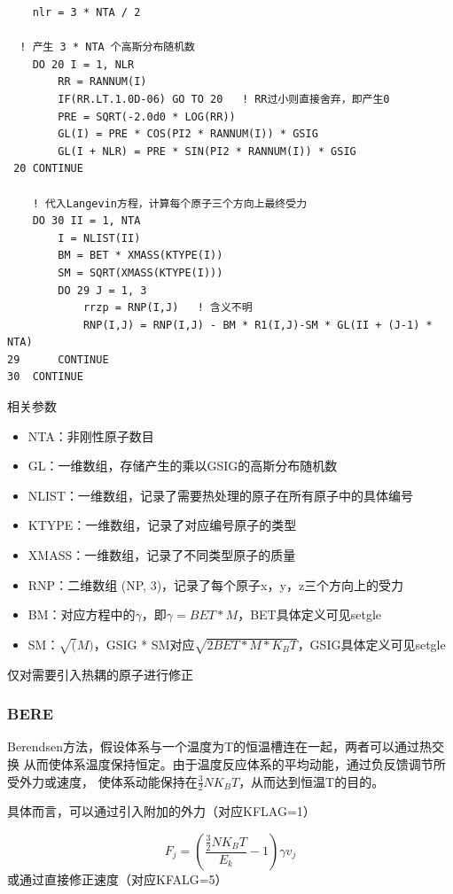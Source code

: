 \documentclass{ctexart}
\begin{document}
\begin{verbatim}
    nlr = 3 * NTA / 2
      
  ! 产生 3 * NTA 个高斯分布随机数
    DO 20 I = 1, NLR
        RR = RANNUM(I)
        IF(RR.LT.1.0D-06) GO TO 20   ! RR过小则直接舍弃，即产生0
        PRE = SQRT(-2.0d0 * LOG(RR))
        GL(I) = PRE * COS(PI2 * RANNUM(I)) * GSIG
        GL(I + NLR) = PRE * SIN(PI2 * RANNUM(I)) * GSIG
 20 CONTINUE

    ! 代入Langevin方程，计算每个原子三个方向上最终受力
    DO 30 II = 1, NTA
        I = NLIST(II)
        BM = BET * XMASS(KTYPE(I))
        SM = SQRT(XMASS(KTYPE(I)))
        DO 29 J = 1, 3
            rrzp = RNP(I,J)   ! 含义不明
            RNP(I,J) = RNP(I,J) - BM * R1(I,J)-SM * GL(II + (J-1) * NTA)
29      CONTINUE
30  CONTINUE
\end{verbatim}

\noindent
相关参数

\begin{itemize}
    \item NTA：非刚性原子数目
    \item GL：一维数组，存储产生的乘以GSIG的高斯分布随机数
    \item NLIST：一维数组，记录了需要热处理的原子在所有原子中的具体编号
    \item KTYPE：一维数组，记录了对应编号原子的类型
    \item XMASS：一维数组，记录了不同类型原子的质量
    \item RNP：二维数组 (NP, 3)，记录了每个原子x，y，z三个方向上的受力
    \item BM：对应方程中的$\gamma$，即$\gamma = BET * M$，BET具体定义可见setgle
    \item SM：$\sqrt(M)$，GSIG * SM对应$\sqrt{2 BET * M * K_B T}$，GSIG具体定义可见setgle
\end{itemize}

仅对需要引入热耦的原子进行修正

\subsubsection{BERE}

Berendsen方法，假设体系与一个温度为T的恒温槽连在一起，两者可以通过热交换
从而使体系温度保持恒定。由于温度反应体系的平均动能，通过负反馈调节所受外力或速度，
使体系动能保持在$\frac{3}{2}NK_BT$，从而达到恒温T的目的。

具体而言，可以通过引入附加的外力（对应KFLAG=1）

\begin{equation}
    F_j = (\frac{\frac{3}{2}NK_BT}{E_k} - 1)\gamma v_j
\end{equation}
或通过直接修正速度（对应KFALG=5）
\end{document}
